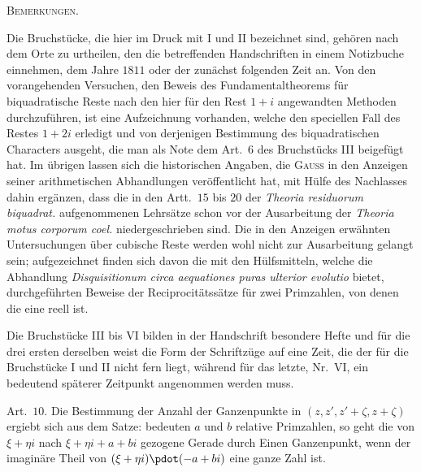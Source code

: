 
\par\bigskip{}
\begin{center}\large\scshape Bemerkungen.\end{center}
Die Bruchstücke, die hier im Druck mit I und II bezeichnet sind, gehören nach dem Orte zu urtheilen, den die betreffenden Handschriften in einem Notizbuche einnehmen, dem Jahre $1811$ oder der zunächst folgenden Zeit an. Von den vorangehenden Versuchen, den Beweis des Fundamentaltheorems für biquadratische Reste nach den hier für den Rest $1+i$ angewandten Methoden durchzuführen, ist eine Aufzeichnung vorhanden, welche den speciellen Fall des Restes $1+2i$ erledigt und von derjenigen Bestimmung des biquadratischen Characters ausgeht, die man als Note dem Art.\ $6$ des Bruchstücks III beigefügt hat. Im übrigen lassen sich die historischen Angaben, die \textsc{Gauss} in den Anzeigen seiner arithmetischen Abhandlungen veröffentlicht hat, mit Hülfe des Nachlasses dahin ergänzen, dass die in den Artt.\ $15$ bis $20$ der \emph{Theoria residuorum biquadrat.} aufgenommenen Lehrsätze schon vor der Ausarbeitung der \emph{Theoria motus corporum coel.} niedergeschrieben sind. Die in den Anzeigen erwähnten Untersuchungen über cubische Reste werden wohl nicht zur Ausarbeitung gelangt sein; aufgezeichnet finden sich davon die mit den Hülfsmitteln, welche die Abhandlung \emph{Disquisitionum circa aequationes puras ulterior evolutio} bietet, durchgeführten Beweise der Reciprocitätssätze für zwei Primzahlen, von denen die eine reell ist.

Die Bruchstücke III bis VI bilden in der Handschrift besondere Hefte und für die drei ersten derselben weist die Form der Schriftzüge auf eine Zeit, die der für die Bruchstücke I und II nicht fern liegt, während für das letzte, Nr.\ VI, ein bedeutend späterer Zeitpunkt angenommen werden muss.

\par\medskip
[I.] Art.\ $10$. Die Bestimmung der Anzahl der Ganzenpunkte in $(z,z',z'+\zeta,z+\zeta)$ ergiebt sich aus dem Satze: bedeuten $a$ und $b$ relative Primzahlen, so geht die von $\xi+\eta i$ nach $\xi+\eta i+a+bi$ gezogene Gerade durch Einen Ganzenpunkt, wenn der imaginäre Theil von $(\xi+\eta i)\pdot(-a+bi)$ eine ganze Zahl ist.


